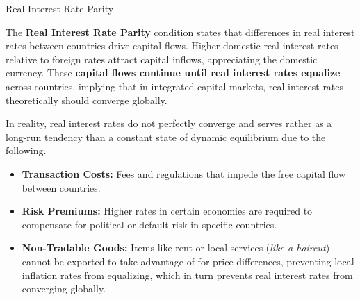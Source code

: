 \documentclass[10pt]{article}
\begin{document}
    \begin{core}{Real Interest Rate Parity}

      The \textbf{Real Interest Rate Parity} condition states that differences in real interest rates between countries drive capital flows. Higher domestic real interest rates relative to foreign rates attract capital inflows, appreciating the domestic currency. These \textbf{capital flows continue until real interest rates equalize} across countries, implying that in integrated capital markets, real interest rates theoretically should converge globally.

      In reality, real interest rates do not perfectly converge and serves rather as a long-run tendency than a constant state of dynamic equilibrium due to the following.

      \begin{itemize}

          \item \textbf{Transaction Costs:} Fees and regulations that impede the free capital flow between countries.

          \item \textbf{Risk Premiums:} Higher rates in certain economies are required to compensate for political or default risk in specific countries.

          \item \textbf{Non-Tradable Goods:} Items like rent or local services (\textit{like a haircut}) cannot be exported to take advantage of for price differences, preventing local inflation rates from equalizing, which in turn prevents real interest rates from converging globally.

      \end{itemize}

    \end{core}
\end{document}
